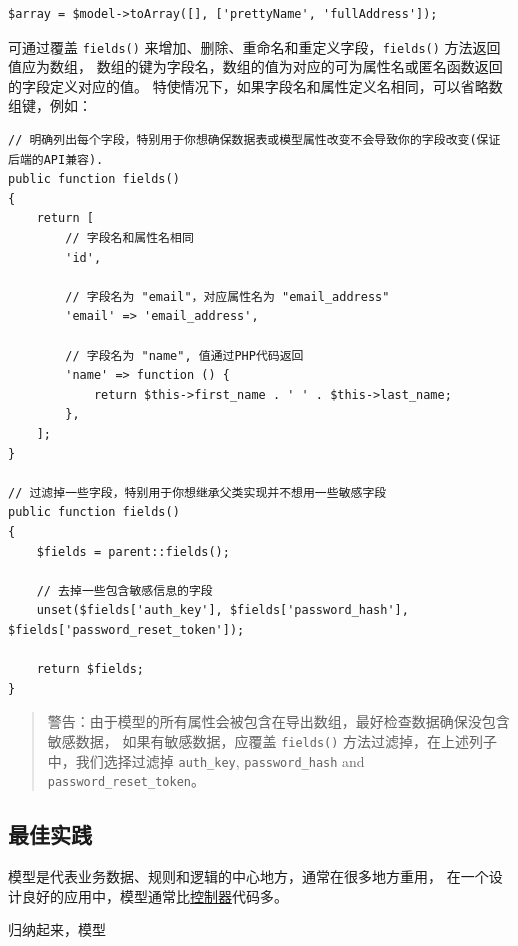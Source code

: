 \lstset{language=php}\begin{lstlisting}
$array = $model->toArray([], ['prettyName', 'fullAddress']);
\end{lstlisting}
可通过覆盖 \lstinline|fields()| 来增加、删除、重命名和重定义字段，\lstinline|fields()| 方法返回值应为数组，
数组的键为字段名，数组的值为对应的可为属性名或匿名函数返回的字段定义对应的值。
特使情况下，如果字段名和属性定义名相同，可以省略数组键，例如：

\lstset{language=php}\begin{lstlisting}
// 明确列出每个字段，特别用于你想确保数据表或模型属性改变不会导致你的字段改变(保证后端的API兼容).
public function fields()
{
    return [
        // 字段名和属性名相同
        'id',

        // 字段名为 "email"，对应属性名为 "email_address"
        'email' => 'email_address',

        // 字段名为 "name", 值通过PHP代码返回
        'name' => function () {
            return $this->first_name . ' ' . $this->last_name;
        },
    ];
}

// 过滤掉一些字段，特别用于你想继承父类实现并不想用一些敏感字段
public function fields()
{
    $fields = parent::fields();

    // 去掉一些包含敏感信息的字段
    unset($fields['auth_key'], $fields['password_hash'], $fields['password_reset_token']);

    return $fields;
}
\end{lstlisting}
\begin{quote}警告：由于模型的所有属性会被包含在导出数组，最好检查数据确保没包含敏感数据，
如果有敏感数据，应覆盖 \lstinline|fields()| 方法过滤掉，在上述列子中，我们选择过滤掉
\lstinline|auth_key|, \lstinline|password_hash| and \lstinline|password_reset_token|。

\end{quote}
\subsection{最佳实践 \label{structure-models.md::best-practices}}
模型是代表业务数据、规则和逻辑的中心地方，通常在很多地方重用，
在一个设计良好的应用中，模型通常比\hyperref[structure-controllers.md]{控制器}代码多。

归纳起来，模型

